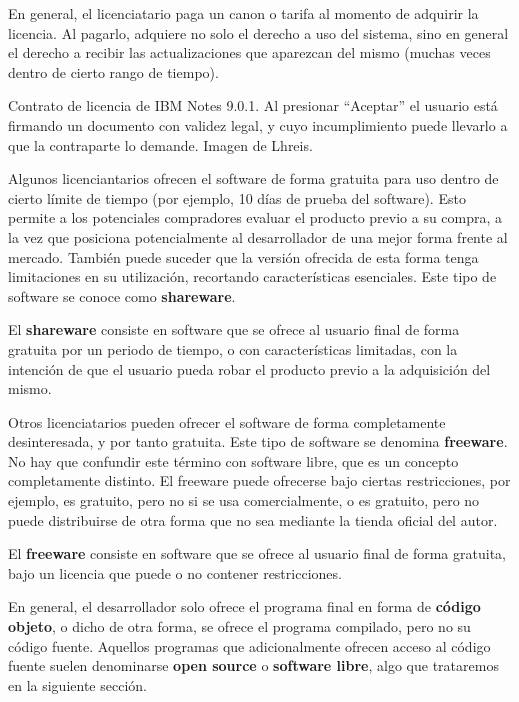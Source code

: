 En general, el licenciatario paga un canon o tarifa al momento de adquirir la
licencia. Al pagarlo, adquiere no solo el derecho a uso del sistema, sino en general
el derecho a recibir las actualizaciones que aparezcan del mismo (muchas veces
dentro de cierto rango de tiempo). 

{Contrato de licencia de IBM Notes 9.0.1. Al presionar ``Aceptar'' el usuario
está firmando un documento con validez legal, y cuyo incumplimiento puede
llevarlo a que la contraparte lo demande.}
{Imagen de Lhreis.}

Algunos licenciantarios ofrecen el software de forma gratuita para uso dentro de
cierto límite de tiempo (por ejemplo, 10 días de prueba del software). Esto
permite a los potenciales compradores evaluar el producto previo a su compra,
a la vez que posiciona potencialmente al desarrollador de una mejor forma frente
al mercado. También puede suceder que la versión ofrecida de esta forma tenga
limitaciones en su utilización, recortando características esenciales. Este
tipo de software se conoce como \textbf{shareware}.

\begin{definition}
    El \textbf{shareware} consiste en software que se ofrece al usuario final de
    forma gratuita por un periodo de tiempo, o con características limitadas,
    con la intención de que el usuario pueda robar el producto previo a
    la adquisición del mismo.\autocite{mw_shareware_2018}
\end{definition}

Otros licenciatarios pueden ofrecer el software de forma completamente desinteresada,
y por tanto gratuita. Este tipo de software se denomina \textbf{freeware}. No
hay que confundir este término con software libre, que es un concepto completamente
distinto. El freeware puede ofrecerse bajo ciertas restricciones, por ejemplo,
es gratuito, pero no si se usa comercialmente, o es gratuito, pero no puede
distribuirse de otra forma que no sea mediante la tienda oficial del autor.

\begin{definition}
    El \textbf{freeware} consiste en software que se ofrece al usuario final de
    forma gratuita, bajo un licencia que puede o no contener restricciones.\autocite{mw_freeware_2018}
\end{definition}

En general, el desarrollador solo ofrece el programa final en forma de
\textbf{código objeto}, o dicho de otra forma, se ofrece el programa compilado,
pero no su código fuente. Aquellos programas que adicionalmente ofrecen acceso
al código fuente suelen denominarse \textbf{open source} o \textbf{software libre},
algo que trataremos en la siguiente sección.

